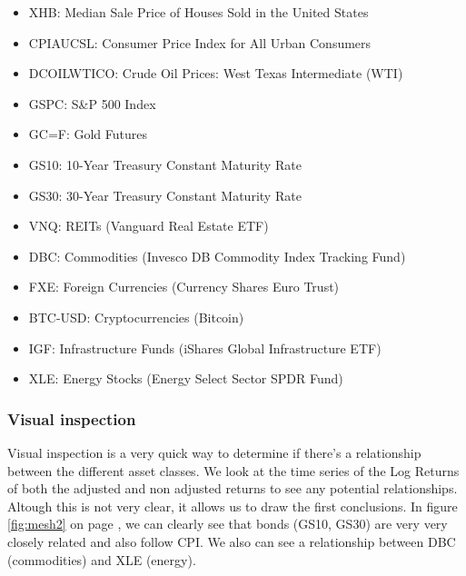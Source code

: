 \documentclass{article}
\begin{document}
\begin{itemize}
    \item XHB: Median Sale Price of Houses Sold in the United States
    \item CPIAUCSL: Consumer Price Index for All Urban Consumers
    \item DCOILWTICO: Crude Oil Prices: West Texas Intermediate (WTI)
    \item GSPC: S\&P 500 Index
    \item GC=F: Gold Futures
    \item GS10: 10-Year Treasury Constant Maturity Rate
    \item GS30: 30-Year Treasury Constant Maturity Rate
    \item VNQ: REITs (Vanguard Real Estate ETF)
    \item DBC: Commodities (Invesco DB Commodity Index Tracking Fund)
    \item FXE: Foreign Currencies (Currency Shares Euro Trust)
    \item BTC-USD: Cryptocurrencies (Bitcoin)
    \item IGF: Infrastructure Funds (iShares Global Infrastructure ETF)
    \item XLE: Energy Stocks (Energy Select Sector SPDR Fund)
\end{itemize}

\subsubsection*{Visual inspection}

Visual inspection is a very quick way to determine if there's a relationship between the different asset classes. We look at the time series of the Log Returns of both the adjusted and non adjusted returns to see any potential relationships. Altough this is not very clear, it allows us to draw the first conclusions. In figure \ref{fig:mesh2} on page \pageref{fig:mesh2}, we can clearly see that bonds (GS10, GS30) are very very closely related and also follow CPI. We also can see a relationship between DBC (commodities) and XLE (energy).
\end{document}
